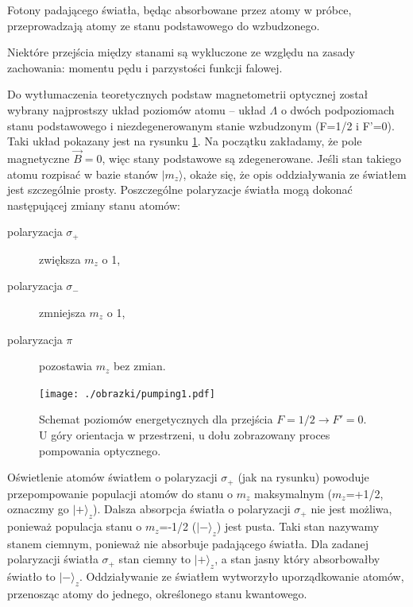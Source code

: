 \documentclass[a4paper,10pt,twoside]{article}
\begin{document}
Fotony padającego światła, będąc absorbowane przez atomy w próbce, przeprowadzają atomy ze stanu podstawowego do wzbudzonego.

Niektóre przejścia między stanami są wykluczone ze względu na zasady zachowania: momentu pędu i parzystości funkcji falowej. 

Do wytłumaczenia teoretycznych podstaw magnetometrii optycznej został wybrany najprostszy układ poziomów atomu -- układ $\Lambda$ o dwóch podpoziomach stanu podstawowego i niezdegenerowanym stanie wzbudzonym (F=1/2 i F'=0).
Taki układ pokazany jest na rysunku \ref{poziomyL}. Na początku zakładamy, że pole magnetyczne $\vec B=0$, więc stany podstawowe są zdegenerowane.
Jeśli stan takiego atomu rozpisać w bazie stanów $\lvert m_z \rangle$, okaże się, że opis oddziaływania ze światłem jest szczególnie prosty. Poszczególne polaryzacje światła mogą dokonać następującej zmiany stanu atomów:
\begin{center}
\begin{description}
\item[polaryzacja $\sigma_+$] zwiększa $m_z$ o 1,
\item[polaryzacja $\sigma_-$] zmniejsza $m_z$ o 1,
\item[polaryzacja $\pi$] pozostawia $m_z$ bez zmian.
\end{description}
\end{center}


\begin{figure}[h!]
\begin{center}
 \texttt{[image: ./obrazki/pumping1.pdf]}
\end{center}
\caption{ Schemat poziomów energetycznych dla przejścia $F=1/2 \rightarrow F'=0$. U góry orientacja w przestrzeni, u dołu zobrazowany proces pompowania optycznego.}
\label{poziomyL}
\end{figure}

Oświetlenie atomów światłem o polaryzacji $\sigma_+$ (jak na rysunku) powoduje przepompowanie populacji atomów do stanu o $m_z$ maksymalnym ($m_z$=+1/2, oznaczmy go $\lvert + \rangle_z$). Dalsza absorpcja światła o polaryzacji $\sigma_+$ nie jest możliwa, ponieważ populacja stanu o $m_z$=-1/2 ($\lvert - \rangle_z$) jest pusta. Taki stan nazywamy stanem ciemnym, ponieważ nie absorbuje padającego światła. Dla zadanej polaryzacji  światła $\sigma_+$ stan ciemny to $\lvert + \rangle_z$, a stan jasny który absorbowałby światło to $\lvert - \rangle_z$. Oddziaływanie ze światłem wytworzyło uporządkowanie atomów, przenosząc atomy do jednego, określonego stanu kwantowego.
 
\end{document}
